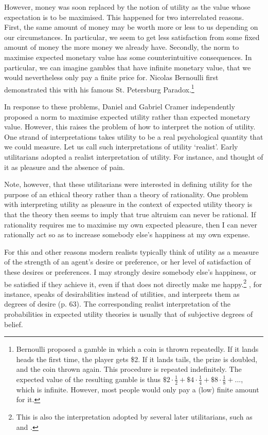 However, money was soon replaced by the notion of utility as the value whose expectation is to be maximised. This happened for two interrelated reasons. First, the same amount of money may be worth more or less to us depending on our circumstances. In particular, we seem to get less satisfaction from some fixed amount of money the more money we already have. Secondly, the norm to maximise expected monetary value has some counterintuitive consequences. In particular, we can imagine gambles that have infinite monetary value, that we would nevertheless only pay a finite price for. Nicolas Bernoulli first demonstrated this with his famous St. Petersburg Paradox.\footnote{Bernoulli proposed a gamble in which a coin is thrown repeatedly. If it lands heads the first time, the player gets \$2. If it lands tails, the prize is doubled, and the coin thrown again. This procedure is repeated indefinitely. The expected value of the resulting gamble is thus $\$2 \cdot \frac{1}{2} + \$4 \cdot \frac{1}{4} + \$8 \cdot \frac{1}{8} +...$, which is infinite. However, most people would only pay a (low) finite amount for it.}

In response to these problems, Daniel \citet{Bernouilli1738} and Gabriel Cramer independently proposed a norm to maximise expected utility rather than expected monetary value. However, this raises the problem of how to interpret the notion of utility. One strand of interpretations takes utility to be a real psychological quantity that we could measure. Let us call such interpretations of utility `realist'. Early utilitarians adopted a realist interpretation of utility. For instance, \citet{Bentham1789} and \citet{Mill1861} thought of it as pleasure and the absence of pain.

Note, however, that these utilitarians were interested in defining utility for the purpose of an ethical theory rather than a theory of rationality. One problem with interpreting utility as pleasure in the context of expected utility theory is that the theory then seems to imply that true altruism can never be rational. If rationality requires me to maximise my own expected pleasure, then I can never rationally act so as to increase somebody else's happiness at my own expense.

For this and other reasons modern realists typically think of utility as a measure of the strength of an agent's desire or preference, or her level of satisfaction of these desires or preferences. I may strongly desire somebody else's happiness, or be satisfied if they achieve it, even if that does not directly make me happy.\footnote{This is also the interpretation adopted by several later utilitarians, such as \citet{Hare1981} and \citet{Singer1993}.} \citet{Jeffrey1983}, for instance, speaks of desirabilities instead of utilities, and interprets them as degrees of desire (p. 63). The corresponding realist interpretation of the probabilities in expected utility theories is usually that of subjective degrees of belief.

